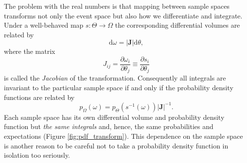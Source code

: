 \documentclass[11pt, oneside]{article}
\newcommand{\dd}{ \mathrm{d} }
\begin{document}
The problem with the real numbers is that mapping between sample
spaces transforms not only the event space but also how we differentiate
and integrate.  Under a well-behaved map $s : \Theta \rightarrow \Omega$ 
the corresponding differential volumes are related by
%
\begin{equation*}
\dd \omega = \left| \mathbf{J} \right| \dd \theta,
\end{equation*}
%
where the matrix
%
\begin{equation*}
J_{ij} 
= 
\frac{\partial \omega_{i} }{ \partial \theta_{j} }
\equiv 
\frac{ \partial s_{i} }{ \partial \theta_{j} }
\end{equation*} 
%
is called the \emph{Jacobian} of the transformation.  Consequently
all integrals are invariant to the particular sample space if and only
if the probability density functions are related by
%
\begin{equation*}
p_{\Omega} \! \left( \omega \right) 
= 
p_{\Theta} \! \left( s^{-1} \! \left( \omega \right) \right) | \mathbf{J} |^{-1}.
\end{equation*}
%
Each sample space has its own differential volume and probability density 
function but \emph{the same integrals} and, hence, the same probabilities 
and expectations (Figure \ref{fig:pdf_transform}).  This dependence on the
sample space is another reason to be careful not to take a probability
density function in isolation too seriously.
\end{document}
